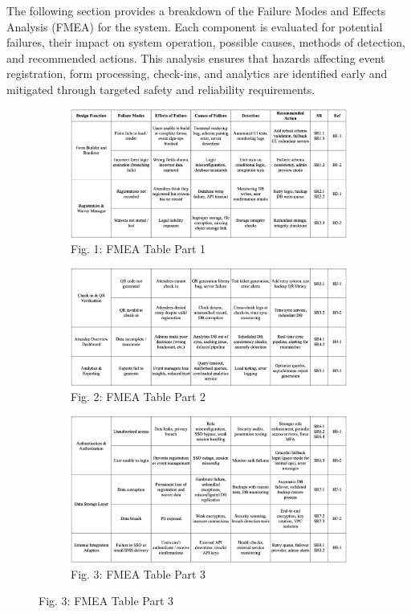 \documentclass[12pt]{article}
\begin{document}
The following section provides a breakdown of the Failure Modes and Effects Analysis (FMEA) for the system. Each component is evaluated for potential failures, their impact on system operation, possible causes, methods of detection, and recommended actions. This analysis ensures that hazards affecting event registration, form processing, check-ins, and analytics are identified early and mitigated through targeted safety and reliability requirements.
\begin{figure}[H]
\begin{subfigure}{\textwidth}
    \centering\includegraphics[width=\textwidth]{FMEA_images/FMEA_1.png}
    \caption{Fig. 1: FMEA Table Part 1}
\end{subfigure}

\begin{subfigure}{\textwidth}
    \centering\includegraphics[width=\textwidth]{FMEA_images/FMEA_2.png}
    \caption{Fig. 2: FMEA Table Part 2}
\end{subfigure}

\begin{subfigure}{\textwidth}
    \centering\includegraphics[width=\textwidth]{FMEA_images/FMEA_3.png}
    \caption{Fig. 3: FMEA Table Part 3}
\end{subfigure}
\end{figure}
\end{document}
